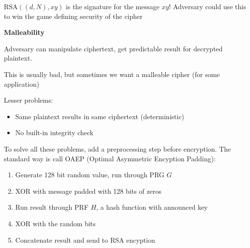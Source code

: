 $\text{RSA}((d,N), xy)$ is the signature for the message $xy$! Adversary could use this to win the game defining security of the cipher

\begin{definition}
{\bf Malleability}

Adversary can manipulate ciphertext, get predictable result for decrypted
plaintext.

This is usually bad, but sometimes we want a malleable cipher (for some
application)
\end{definition}

Lesser problems:
\begin{itemize}
    \item Same plaintext results in same ciphertext (deterministic)
    \item No built-in integrity check
\end{itemize}

To solve all these problems, add a preprocessing step before encryption. The
standard way is call OAEP (Optimal Asymmetric Encyption Padding):
\begin{enumerate}
    \item Generate 128 bit random value, run through PRG $G$
    \item XOR with message padded with 128 bits of zeros
    \item Run result through PRF $H$, a hash function with announced key
    \item XOR with the random bits
    \item Concatenate result and send to RSA encyption
\end{enumerate}

\makebox[2cm]{}\makebox[.5cm]{}\\
\makebox[.5cm]{}\\
\makebox[6cm]{\makebox[3.5cm]{$\downarrow$}\makebox[.5cm]{}\makebox[2cm]{$\downarrow$}}\\
\makebox[1.5cm]{}\makebox[.5cm]{$\oplus$}\makebox[.4cm]{$\downarrow$}\\
\makebox[6cm]{\makebox[3.5cm]{$\downarrow$}\makebox[.5cm]{}\makebox[2cm]{$\downarrow$}}\\
\makebox[1.5cm]{}\makebox[.5cm]{$\downarrow$}\makebox[.4cm]{$\oplus$}\\
\makebox[1.5cm]{}\makebox[.5cm]{$\downarrow$}\makebox[2.8cm]{\rule[-0.1cm]{2.8cm}{0.01cm}}\makebox[.4cm]{$\downarrow$}\\
\makebox[1.5cm]{}\makebox[.5cm]{}\makebox[2.8cm]{$\downarrow$}\makebox[.4cm]{}\\
\makebox[1.5cm]{}\makebox[.5cm]{}\makebox[.4cm]{}\\

